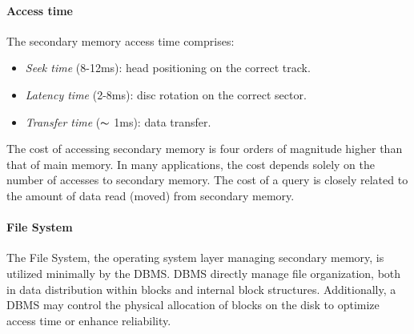 \paragraph*{Access time} 
The secondary memory access time comprises:
\begin{itemize}
    \item \textit{Seek time} (8-12ms): head positioning on the correct track. 
    \item \textit{Latency time} (2-8ms): disc rotation on the correct sector. 
    \item \textit{Transfer time} ($\thicksim$ 1ms): data transfer.
\end{itemize}
The cost of accessing secondary memory is four orders of magnitude higher than that of main memory.
In many applications, the cost depends solely on the number of accesses to secondary memory.
The cost of a query is closely related to the amount of data read (moved) from secondary memory.

\paragraph*{File System} 
The File System, the operating system layer managing secondary memory, is utilized minimally by the DBMS.
DBMS directly manage file organization, both in data distribution within blocks and internal block structures. 
Additionally, a DBMS may control the physical allocation of blocks on the disk to optimize access time or enhance reliability.